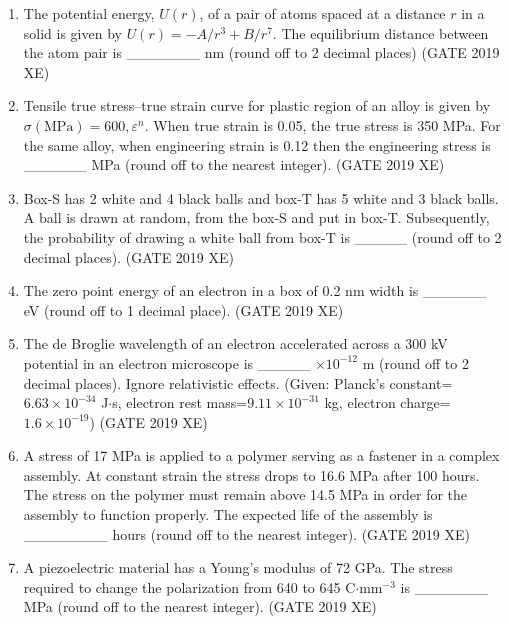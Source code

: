 \documentclass[journal,12pt,onecolumn]{IEEEtran}
\begin{document}
\begin{enumerate}
\item The potential energy, $U(r)$, of a pair of atoms spaced at a distance $r$ in a solid is given by $U(r)=-A/r^{3} + B/r^{7}$. The equilibrium distance between the atom pair is \_\_\_\_\_\_\_ nm (round off to 2 decimal places)
\hfill{(GATE 2019 XE)} \\


\item Tensile true stress–true strain curve for plastic region of an alloy is given by $\sigma(\text{MPa})=600,\varepsilon^{n}$. When true strain is 0.05, the true stress is 350 MPa. For the same alloy, when engineering strain is 0.12 then the engineering stress is \_\_\_\_\_\_ MPa (round off to the nearest integer).
\hfill{(GATE 2019 XE)} \\


\item Box-S has 2 white and 4 black balls and box-T has 5 white and 3 black balls. A ball is drawn at random, from the box-S and put in box-T. Subsequently, the probability of drawing a white ball from box-T is \_\_\_\_\_ (round off to 2 decimal places).
\hfill{(GATE 2019 XE)} \\


\item The zero point energy of an electron in a box of 0.2 nm width is \_\_\_\_\_\_ eV (round off to 1 decimal place).
\hfill{(GATE 2019 XE)} \\



\item The de Broglie wavelength of an electron accelerated across a 300 kV potential in an electron microscope is \_\_\_\_\_ $\times10^{-12}$ m (round off to 2 decimal places). Ignore relativistic effects. (Given: Planck's constant=$6.63\times10^{-34}$ J$\cdot$s, electron rest mass=$9.11\times10^{-31}$ kg, electron charge=$1.6\times10^{-19}$)
\hfill{(GATE 2019 XE)} \\


\item A stress of 17 MPa is applied to a polymer serving as a fastener in a complex assembly. At constant strain the stress drops to 16.6 MPa after 100 hours. The stress on the polymer must remain above 14.5 MPa in order for the assembly to function properly. The expected life of the assembly is \_\_\_\_\_\_\_\_ hours (round off to the nearest integer).
\hfill{(GATE 2019 XE)} \\


\item A piezoelectric material has a Young's modulus of 72 GPa. The stress required to change the polarization from 640 to 645 C$\cdot$mm$^{-3}$ is \_\_\_\_\_\_\_ MPa (round off to the nearest integer).
\hfill{(GATE 2019 XE)} \\



\end{enumerate}
\end{document}
